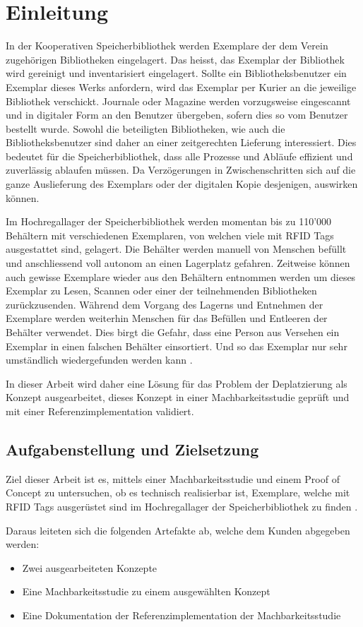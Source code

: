 \chapter{Einleitung}
In der Kooperativen Speicherbibliothek werden Exemplare der dem Verein zugehörigen Bibliotheken eingelagert. Das heisst, das Exemplar der Bibliothek wird gereinigt und inventarisiert eingelagert. Sollte ein Bibliotheksbenutzer ein Exemplar dieses Werks anfordern, wird das Exemplar per Kurier an die jeweilige Bibliothek verschickt. Journale oder Magazine werden vorzugsweise eingescannt und in digitaler Form an den Benutzer übergeben, sofern dies so vom Benutzer bestellt wurde. Sowohl die beteiligten Bibliotheken, wie auch die Bibliotheksbenutzer sind daher an einer zeitgerechten Lieferung interessiert. Dies bedeutet für die Speicherbibliothek, dass alle Prozesse und Abläufe effizient und zuverlässig ablaufen müssen. Da Verzögerungen in Zwischenschritten sich auf die ganze Auslieferung des Exemplars oder der digitalen Kopie desjenigen, auswirken können.

Im Hochregallager der Speicherbibliothek werden momentan bis zu 110'000 Behältern mit verschiedenen Exemplaren, von welchen viele mit RFID Tags ausgestattet sind, gelagert. Die Behälter werden manuell von Menschen befüllt und anschliessend voll autonom an einen Lagerplatz gefahren. Zeitweise können auch gewisse Exemplare wieder aus den Behältern entnommen werden um dieses Exemplar zu Lesen, Scannen oder einer der teilnehmenden Bibliotheken zurückzusenden. Während dem Vorgang des Lagerns und Entnehmen der Exemplare werden weiterhin Menschen für das Befüllen und Entleeren der Behälter verwendet. Dies birgt die Gefahr, dass eine Person aus Versehen ein Exemplar in einen falschen Behälter einsortiert. Und so das Exemplar nur sehr umständlich wiedergefunden werden kann \parencite{WickiBaumann2019Projektbeschrieb}.

In dieser Arbeit wird daher eine Lösung für das Problem der Deplatzierung als Konzept ausgearbeitet, dieses Konzept in einer Machbarkeitsstudie geprüft und mit einer Referenzimplementation validiert.

\section{Aufgabenstellung und Zielsetzung}
Ziel dieser Arbeit ist es, mittels einer Machbarkeitsstudie und einem Proof of Concept zu untersuchen, ob es technisch realisierbar ist, Exemplare, welche mit RFID Tags ausgerüstet sind im Hochregallager der Speicherbibliothek zu finden \parencite{WickiBaumann2019Projektbeschrieb}.

Daraus leiteten sich die folgenden Artefakte ab, welche dem Kunden abgegeben werden:
\begin{itemize}
	\item Zwei ausgearbeiteten Konzepte
	\item Eine Machbarkeitsstudie zu einem ausgewählten Konzept
	\item Eine Dokumentation der Referenzimplementation der Machbarkeitsstudie
\end{itemize}
